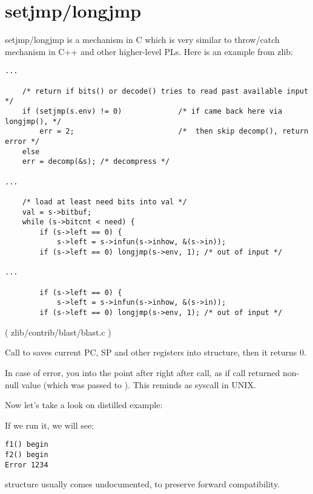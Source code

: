 \section{setjmp/longjmp}


setjmp/longjmp is a mechanism in C which is very similar to throw/catch mechanism in C++ and other higher-level \ac{PL}s.
Here is an example from zlib:

\begin{lstlisting}[style=customc]
...

    /* return if bits() or decode() tries to read past available input */
    if (setjmp(s.env) != 0)             /* if came back here via longjmp(), */
        err = 2;                        /*  then skip decomp(), return error */
    else
	err = decomp(&s); /* decompress */

...

    /* load at least need bits into val */
    val = s->bitbuf;
    while (s->bitcnt < need) {
        if (s->left == 0) {
            s->left = s->infun(s->inhow, &(s->in));
	    if (s->left == 0) longjmp(s->env, 1); /* out of input */

...

        if (s->left == 0) {
            s->left = s->infun(s->inhow, &(s->in));
	    if (s->left == 0) longjmp(s->env, 1); /* out of input */
\end{lstlisting}
( zlib/contrib/blast/blast.c )

Call to  saves current \ac{PC}, \ac{SP} and other registers into  structure, then it returns 0.

In case of error,   you into the point after right after  call,
as if  call returned non-null value (which was passed to ).
This reminds as  syscall in UNIX.

Now let's take a look on distilled example:



If we run it, we will see:

\begin{lstlisting}
f1() begin
f2() begin
Error 1234
\end{lstlisting}

 structure usually comes undocumented, to preserve forward compatibility.

